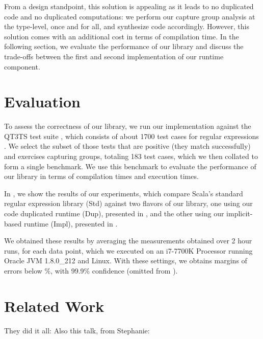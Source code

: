 From a design standpoint, this solution is appealing as it leads to no duplicated code and no duplicated computations: we perform our capture group analysis at the type-level, once and for all, and synthesize code accordingly.
However, this solution comes with an additional cost in terms of compilation time.
In the following section, we evaluate the performance of our library and discuss the trade-offs between the first and second implementation of our runtime component.

\section{Evaluation}

To assess the correctness of our library, we run our implementation against the QT3TS test suite \citep{w3c1994xquery}, which consists of about 1700 test cases for regular expressions \citep[perl-tests.xml]{w3c1994qt3ts}.
We select the subset of those tests that are positive (they match successfully) and exercises capturing groups, totaling 183 test cases, which we then collated to form a single benchmark.
We use this benchmark to evaluate the performance of our library in terms of compilation times and execution times.


In , we show the results of our experiments, which compare Scala's standard regular expression library (Std) against two flavors of our library, one using our code duplicated runtime (Dup), presented in , and the other using our implicit-based runtime (Impl), presented in .

We obtained these results by averaging the measurements obtained over 2 hour runs, for each data point, which we executed on an i7-7700K Processor running Oracle JVM 1.8.0\_212 and Linux.
With these settings, we obtains margins of errors below \%, with 99.9\% confidence (omitted from ).



\section{Related Work}

They did it all: \citep{spishak2012type}
Also this talk, from Stephanie: \citep{weirich2014examples}
